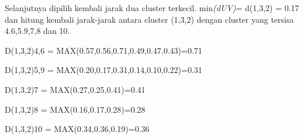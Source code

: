 \begin{enumerate}
\begin{table}[htbp]
\captionsetup{singlelinecheck=off}
\caption{Matrik Jarak, d(4,6)}
\label{tab:my-table}
\end{table}

Selanjutnya dipilih kembali jarak dua cluster terkecil. min\textit{(dUV)}= d(1,3,2) = 0.17 dan hitung kembali jarak-jarak antara cluster (1,3,2)  dengan cluster yang tersisa 4.6,5.9,7,8 dan 10.

D(1,3,2)4,6 = MAX(0.57,0.56,0.71,0.49,0.47,0.43)=0.71

D(1,3,2)5,9 = MAX(0.20,0.17,0.31,0.14,0.10,0.22)=0.31

D(1,3,2)7 = MAX(0.27,0.25,0.41)=0.41

D(1,3,2)8 = MAX(0.16,0.17,0.28)=0.28

D(1,3,2)10 = MAX(0.34,0.36,0.19)=0.36

\begin{table}[htbp]
\captionsetup{singlelinecheck=off}
\caption{ Matrik Jarak, d(1,3,2}
\label{tab:my-table}
\end{table}


\end{enumerate}
